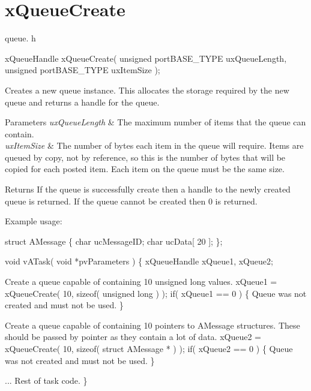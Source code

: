\hypertarget{group__x_queue_create}{\section{x\-Queue\-Create}
\label{group__x_queue_create}
}
queue. h 
\begin{DoxyPre}
 xQueueHandle xQueueCreate(
                                                          unsigned portBASE\_TYPE uxQueueLength,
                                                          unsigned portBASE\_TYPE uxItemSize
                                                  );
   \end{DoxyPre}


Creates a new queue instance. This allocates the storage required by the new queue and returns a handle for the queue.


\begin{DoxyParams}{Parameters}
{\em ux\-Queue\-Length} & The maximum number of items that the queue can contain.\\
\hline
{\em ux\-Item\-Size} & The number of bytes each item in the queue will require. Items are queued by copy, not by reference, so this is the number of bytes that will be copied for each posted item. Each item on the queue must be the same size.\\
\hline
\end{DoxyParams}
\begin{DoxyReturn}{Returns}
If the queue is successfully create then a handle to the newly created queue is returned. If the queue cannot be created then 0 is returned.
\end{DoxyReturn}
Example usage\-: 
\begin{DoxyPre}
 struct AMessage
 \{
        char ucMessageID;
        char ucData[ 20 ];
 \};\end{DoxyPre}



\begin{DoxyPre} void vATask( void *pvParameters )
 \{
 xQueueHandle xQueue1, xQueue2;\end{DoxyPre}



\begin{DoxyPre}Create a queue capable of containing 10 unsigned long values.
        xQueue1 = xQueueCreate( 10, sizeof( unsigned long ) );
        if( xQueue1 == 0 )
        \{
Queue was not created and must not be used.
        \}\end{DoxyPre}



\begin{DoxyPre}Create a queue capable of containing 10 pointers to AMessage structures.
These should be passed by pointer as they contain a lot of data.
        xQueue2 = xQueueCreate( 10, sizeof( struct AMessage * ) );
        if( xQueue2 == 0 )
        \{
Queue was not created and must not be used.
        \}\end{DoxyPre}



\begin{DoxyPre}... Rest of task code.
 \}
 \end{DoxyPre}
 